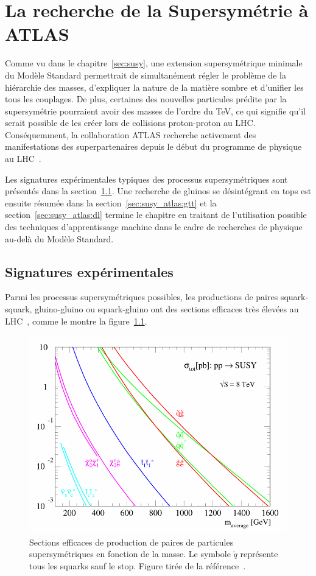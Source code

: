 \singlespacing{}
\chapter{La recherche de la Supersymétrie à ATLAS}
\label{sec:susy_atlas}
\doublespacing{}

Comme vu dans le chapitre~\ref{sec:susy}, une extension
supersymétrique minimale du Modèle Standard permettrait de
simultanément régler le problème de la hiérarchie des masses,
d'expliquer la nature de la matière sombre et d'unifier les tous les
couplages. De plus, certaines des nouvelles particules prédite par la
supersymétrie pourraient avoir des masses de l'ordre du TeV, ce qui
signifie qu'il serait possible de les créer lors de collisions
proton-proton au LHC. Conséquemment, la collaboration ATLAS recherche
activement des manifestations des superpartenaires depuis le début du
programme de physique au LHC~\cite{aad_summary_2015}. 

Les signatures expérimentales typiques des processus supersymétriques
sont présentés dans la section~\ref{sec:susy_atlas:signatures}. Une
recherche de gluinos se désintégrant en tops est ensuite résumée dans
la section~\ref{sec:susy_atlas:gtt} et la
section~\ref{sec:susy_atlas:dl} termine le chapitre en traitant de
l'utilisation possible des techniques d'apprentissage machine dans le
cadre de recherches de physique au-delà du Modèle Standard.

\section{Signatures expérimentales}
\label{sec:susy_atlas:signatures}

Parmi les processus supersymétriques possibles, les productions de
paires squark-squark, gluino-gluino ou squark-gluino ont des sections
efficaces très élevées au LHC~\cite{olive_susy2_2014}, comme le montre
la figure~\ref{fig:susy_xsec}.

\begin{figure}
  \centering
  \includegraphics[width=.5\textwidth]{susy_xsec.pdf}
  \caption{Sections efficaces de production de paires de particules
    supersymétriques en fonction de la masse. Le symbole $\tilde{q}$
    représente tous les squarks sauf le stop. Figure tirée de la
    référence~\cite{olive_susy2_2014}.}
  \label{fig:susy_xsec}
\end{figure}

